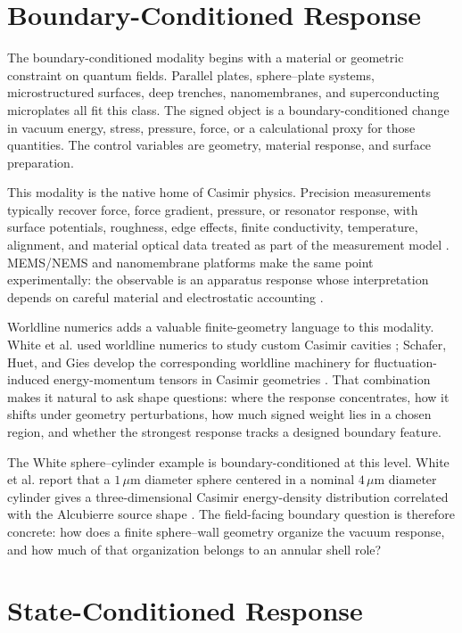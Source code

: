 \documentclass[11pt]{article}
\newcommand{\um}{\,\mu\mathrm{m}}
\begin{document}
\section{Boundary-Conditioned Response}

The boundary-conditioned modality begins with a material or geometric
constraint on quantum fields. Parallel plates, sphere--plate systems,
microstructured surfaces, deep trenches, nanomembranes, and superconducting
microplates all fit this class. The signed object is a boundary-conditioned
change in vacuum energy, stress, pressure, force, or a calculational proxy for
those quantities. The control variables are geometry, material response, and
surface preparation.

This modality is the native home of Casimir physics. Precision measurements
typically recover force, force gradient, pressure, or resonator response, with
surface potentials, roughness, edge effects, finite conductivity, temperature,
alignment, and material optical data treated as part of the measurement model
\cite{Bimonte2021,Behunin2011,Garrett2015}. MEMS/NEMS and nanomembrane
platforms make the same point experimentally: the observable is an apparatus
response whose interpretation depends on careful material and electrostatic
accounting \cite{Decca2011,GarciaSanchez2012,Stange2019}.

Worldline numerics adds a valuable finite-geometry language to this modality.
White et al. used worldline numerics to study custom Casimir cavities
\cite{White2021}; Schafer, Huet, and Gies develop the corresponding
worldline machinery for fluctuation-induced energy-momentum tensors in
Casimir geometries \cite{Schafer2015}. That combination makes it natural to
ask shape questions: where the response concentrates, how it shifts under
geometry perturbations, how much signed weight lies in a chosen region, and
whether the strongest response tracks a designed boundary feature.

The White sphere--cylinder example is boundary-conditioned at this level.
White et al. report that a \(1\um\) diameter sphere centered in a nominal
\(4\um\) diameter cylinder gives a three-dimensional Casimir energy-density
distribution correlated with the Alcubierre source shape \cite{White2021}.
The field-facing boundary question is therefore concrete: how does a finite
sphere--wall geometry organize the vacuum response, and how much of that
organization belongs to an annular shell role?

\section{State-Conditioned Response}
\end{document}
